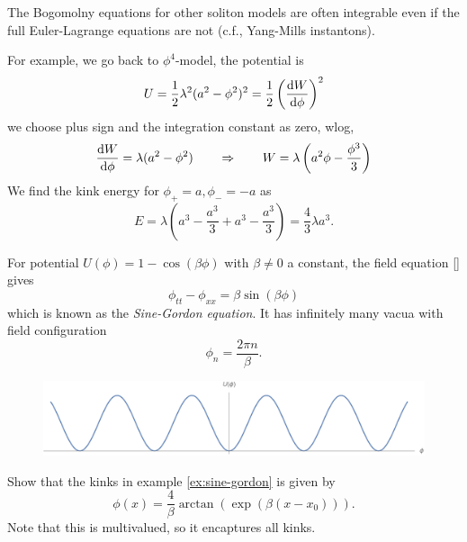 \documentclass[a4paper,11pt]{article}
\begin{document}
    The Bogomolny equations for other soliton models are often integrable even if the full Euler-Lagrange equations are not (c.f., Yang-Mills instantons). 

    For example, we go back to $\phi^4$-model, the potential is 
    \begin{equation}
        U = \frac{1}{2} \lambda^2 (a^2 - \phi^2)^2 = \frac{1}{2} \left( \dv{W}{\phi} \right)^2
    \end{equation}
    we choose plus sign and the integration constant as zero, wlog, 
    \begin{equation}
        \dv{W}{\phi} = \lambda (a^2 - \phi^2) \qquad \Rightarrow\qquad W = \lambda \left(a^2 \phi - \frac{\phi^3}{3}\right)
    \end{equation}
    We find the kink energy for $\phi_+ = a, \phi_- = -a$ as 
    \begin{equation}
        E = \lambda \left( a^3 - \frac{a^3}{3} + a^3 - \frac{a^3}{3} \right) = \frac{4}{3} \lambda a^3.
    \end{equation}

    \begin{ex}
        For potential $U(\phi) = 1 - \cos(\beta \phi)$ with $\beta \neq 0$ a constant, the field equation \ref{} gives 
        \begin{equation}
            \phi_{tt} - \phi_{xx} = \beta \sin(\beta \phi)
        \end{equation}
        which is known as the \emph{Sine-Gordon equation}. It has infinitely many vacua with field configuration 
        \begin{equation}
            \phi_n = \frac{2 \pi n}{\beta}.
        \end{equation}
        \begin{figure}[H]
            \centering
            \includegraphics[width=0.75\linewidth]{fig/fig1.pdf}
        \end{figure}
        \label{ex:sine-gordon}
    \end{ex}

    \begin{exer}
        Show that the kinks in example \ref{ex:sine-gordon} is given by 
        \begin{equation}
            \phi(x) = \frac{4}{\beta} \arctan(\exp(\beta (x - x_0))).
        \end{equation}
        Note that this is multivalued, so it encaptures all kinks.
    \end{exer}
\end{document}
